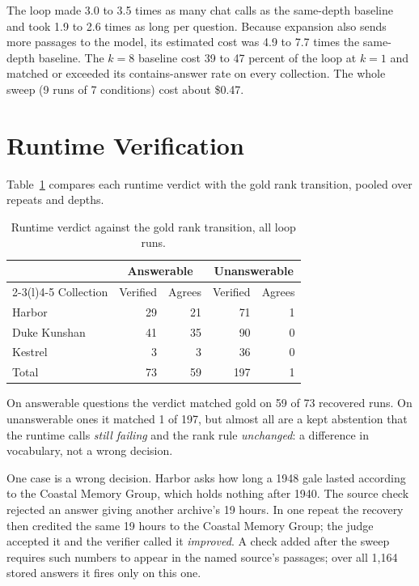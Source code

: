 \documentclass[12pt, a4paper, oneside]{report}
\newcommand{\code}[1]{\texttt{\detokenize{#1}}}
\begin{document}
The loop made 3.0 to 3.5 times as many chat calls as the same-depth
baseline and took 1.9 to 2.6 times as long per question. Because expansion
also sends more passages to the model, its estimated cost was 4.9 to 7.7
times the same-depth baseline. The $k=8$ baseline cost 39 to 47 percent of the loop at
$k=1$ and matched or exceeded its contains-answer rate on every collection.
The whole sweep (9 runs of 7 conditions) cost about \$0.47.

\section{Runtime Verification}
\label{sec:verify}

Table~\ref{tbl:verify} compares each runtime verdict with the gold rank
transition, pooled over repeats and depths.

\begin{table}[htbp]
\centering
\footnotesize
\begin{tabular}{@{}lrrrr@{}}
\toprule
 & \multicolumn{2}{c}{Answerable} & \multicolumn{2}{c}{Unanswerable} \\
\cmidrule(lr){2-3}\cmidrule(l){4-5}
Collection & Verified & Agrees & Verified & Agrees \\
\midrule
Harbor & 29 & 21 & 71 & 1 \\
Duke Kunshan & 41 & 35 & 90 & 0 \\
Kestrel & 3 & 3 & 36 & 0 \\
\midrule
Total & 73 & 59 & 197 & 1 \\
\bottomrule
\end{tabular}
\caption{Runtime verdict against the gold rank transition, all loop runs.}
\label{tbl:verify}
\end{table}

On answerable questions the verdict matched gold on 59 of 73 recovered
runs. On unanswerable ones it matched 1 of 197, but almost all are a kept
abstention that the runtime calls \emph{still failing} and the rank rule
\emph{unchanged}: a difference in vocabulary, not a wrong decision.

One case is a wrong decision. Harbor \code{gold-029} asks how long a 1948
gale lasted according to the Coastal Memory Group, which holds nothing
after 1940. The source check rejected an answer giving another archive's
19 hours. In one repeat the recovery then credited the same 19 hours to the
Coastal Memory Group; the judge accepted it and the verifier called it
\emph{improved}. A check added after the sweep requires such numbers to
appear in the named source's passages; over all 1{,}164 stored answers it
fires only on this one.
\end{document}
